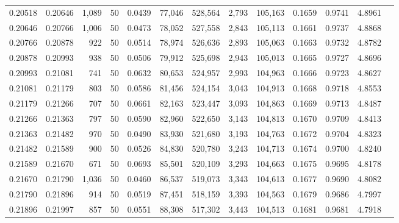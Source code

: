 \begin{tabular}{rrrrrrrrrrrrr}
0.20518 & 0.20646 & 1,089 &  50 &                                     0.0439 &  77,046 & 528,564 &   2,793 & 105,163 & 0.1659 & 0.9741 & 4.8961 \\
0.20646 & 0.20766 & 1,006 &  50 &                                     0.0473 &  78,052 & 527,558 &   2,843 & 105,113 & 0.1661 & 0.9737 & 4.8868 \\
0.20766 & 0.20878 &   922 &  50 &                                     0.0514 &  78,974 & 526,636 &   2,893 & 105,063 & 0.1663 & 0.9732 & 4.8782 \\
0.20878 & 0.20993 &   938 &  50 &                                     0.0506 &  79,912 & 525,698 &   2,943 & 105,013 & 0.1665 & 0.9727 & 4.8696 \\
0.20993 & 0.21081 &   741 &  50 &                                     0.0632 &  80,653 & 524,957 &   2,993 & 104,963 & 0.1666 & 0.9723 & 4.8627 \\
0.21081 & 0.21179 &   803 &  50 &                                     0.0586 &  81,456 & 524,154 &   3,043 & 104,913 & 0.1668 & 0.9718 & 4.8553 \\
0.21179 & 0.21266 &   707 &  50 &                                     0.0661 &  82,163 & 523,447 &   3,093 & 104,863 & 0.1669 & 0.9713 & 4.8487 \\
0.21266 & 0.21363 &   797 &  50 &                                     0.0590 &  82,960 & 522,650 &   3,143 & 104,813 & 0.1670 & 0.9709 & 4.8413 \\
0.21363 & 0.21482 &   970 &  50 &                                     0.0490 &  83,930 & 521,680 &   3,193 & 104,763 & 0.1672 & 0.9704 & 4.8323 \\
0.21482 & 0.21589 &   900 &  50 &                                     0.0526 &  84,830 & 520,780 &   3,243 & 104,713 & 0.1674 & 0.9700 & 4.8240 \\
0.21589 & 0.21670 &   671 &  50 &                                     0.0693 &  85,501 & 520,109 &   3,293 & 104,663 & 0.1675 & 0.9695 & 4.8178 \\
0.21670 & 0.21790 & 1,036 &  50 &                                     0.0460 &  86,537 & 519,073 &   3,343 & 104,613 & 0.1677 & 0.9690 & 4.8082 \\
0.21790 & 0.21896 &   914 &  50 &                                     0.0519 &  87,451 & 518,159 &   3,393 & 104,563 & 0.1679 & 0.9686 & 4.7997 \\
0.21896 & 0.21997 &   857 &  50 &                                     0.0551 &  88,308 & 517,302 &   3,443 & 104,513 & 0.1681 & 0.9681 & 4.7918 \\

\end{tabular}
